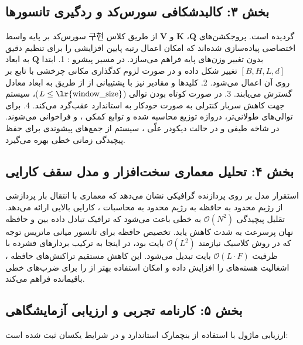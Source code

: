 \subsection*{بخش ۳: کالبدشکافی سورس‌کد و ردگیری تانسورها }
سورس‌کد  بر پایه واسط  구현 گردیده است. پروجکشن‌های $\mathbf{Q}$، $\mathbf{K}$ و $\mathbf{V}$ از طریق کلاس اختصاصی  پیاده‌سازی شده‌اند که امکان اعمال رتبه پایین افزایشی  را برای تنظیم دقیق  بدون تغییر وزن‌های پایه  فراهم می‌سازد. در مسیر پیشرو :
1. ابتدا $\mathbf{Q}$ به ابعاد $[B, H, L, d]$ تغییر شکل داده و در صورت لزوم کدگذاری مکانی چرخشی  با تابع  بر روی آن اعمال می‌شود.
2. کلیدها و مقادیر نیز با پشتیبانی از  از طریق  به ابعاد معادل گسترش می‌یابند.
3. در صورت کوتاه بودن توالی ($L \le \text{\lr{window\_size}}$)، سیستم جهت کاهش سربار کنترلی به صورت خودکار به  استاندارد عقب‌گرد  می‌کند.
4. برای توالی‌های طولانی‌تر، دروازه توزیع محاسبه شده و توابع کمکی ،  و  فراخوانی می‌شوند. در شاخه طیفی و در حالت دیکودر علّی ، سیستم از جمع‌های پیشوندی  برای حفظ پیچیدگی زمانی خطی بهره می‌گیرد.

\subsection*{بخش ۴: تحلیل معماری سخت‌افزار و مدل سقف کارایی }
استقرار مدل بر روی پردازنده گرافیکی  نشان می‌دهد که معماری  با انتقال بار پردازشی از رژیم محدود به حافظه  به رژیم محدود به محاسبات ، کارایی بالایی ارائه می‌دهد. تقلیل پیچیدگی $\mathcal{O}(N^2)$ به خطی باعث می‌شود که ترافیک تبادل داده بین  و حافظه نهان پرسرعت  به شدت کاهش یابد.
تخصیص حافظه برای تانسور میانی ماتریس توجه که در روش کلاسیک نیازمند $\mathcal{O}(L^2)$ بایت بود، در اینجا به ترکیب بردارهای فشرده با ظرفیت $\mathcal{O}(L \cdot F)$ بایت تبدیل می‌شود. این کاهش مستقیم تراکنش‌های حافظه ، اشغالیت  هسته‌های  را افزایش داده و امکان استفاده بهتر از  را برای ضرب‌های خطی باقیمانده فراهم می‌کند.

\subsection*{بخش ۵: کارنامه تجربی و ارزیابی آزمایشگاهی }
ارزیابی ماژول با استفاده از بنچمارک استاندارد و در شرایط یکسان ثبت شده است:

